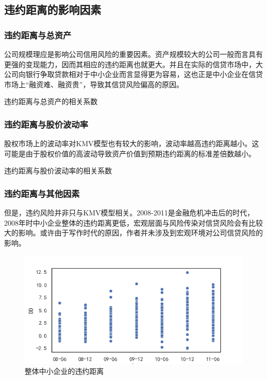 \documentclass{ctexbeamer}
\begin{document}
\subsection{违约距离的影响因素}
\begin{frame}
    \frametitle{违约距离与总资产}

    公司规模理应是影响公司信用风险的重要因素。资产规模较大的公司一般而言具有更强的变现能力，因而其相应的违约距离也就更大。并且在实际的信贷市场中，大公司向银行争取贷款相对于中小企业而言显得更为容易，这也正是中小企业在信贷市场上“融资难、融资贵”，导致其信贷风险偏高的原因。
    \begin{table}[H]
        \centering
        
        \caption{违约距离与总资产的相关系数}\label{tab:asset}
    \end{table}
\end{frame}
\begin{frame}
    \frametitle{违约距离与股价波动率}
    股权市场上的波动率对KMV模型也有较大的影响，波动率越高违约距离越小。这可能是由于股权价值的高波动导致资产价值到预期违约距离的标准差倍数越小。
    \begin{table}[H]
        \centering
        
        \caption{违约距离与股价波动率的相关系数}\label{tab:vol}
    \end{table}
\end{frame}
\begin{frame}
    \frametitle{违约距离与其他因素}
    但是，违约风险并非只与KMV模型相关。2008-2011是金融危机冲击后的时代，2008年时中小企业整体的违约距离更低，宏观层面与风险传染对信贷风险会有比较大的影响。或许由于写作时代的原因，作者并未涉及到宏观环境对公司信贷风险的影响。
    \begin{figure}
        \includegraphics[width=0.8\linewidth]{img/dd.png}
        \caption{整体中小企业的违约距离}
    \end{figure}
\end{frame}
\end{document}
